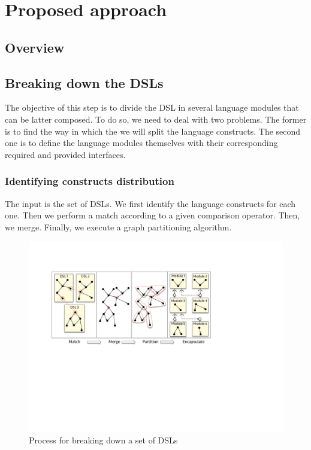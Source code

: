 \section{Proposed approach}
\label{sec:approach}

\subsection{Overview}

\subsection{Breaking down the DSLs}

The objective of this step is to divide the DSL in several language modules that can be latter composed. To do so, we need to deal with two problems. The former is to find the way in which the we will split the language constructs. The second one is to define the language modules themselves with their corresponding required and provided interfaces. 

\subsubsection{Identifying constructs distribution}

The input is the set of DSLs. We first identify the language constructs for each one. Then we perform a match according to a given comparison operator. Then, we merge. Finally, we execute a graph partitioning algorithm. 

\begin{figure}
\centering
\includegraphics[width=1\linewidth]{images/breaking-down.pdf}
\caption{Process for breaking down a set of DSLs}
\label{fig:breaking-down}
\end{figure}

